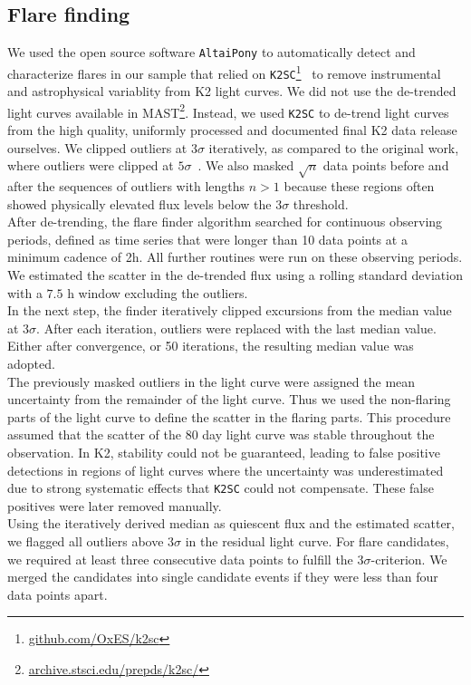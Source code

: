 \documentclass{aa}
\begin{document}
\subsection{Flare finding}
\label{sec:sec:flarefinding}
We used the open source software \texttt{AltaiPony} to automatically detect and characterize flares in our sample that relied on \texttt{K2SC}\footnote{\url{github.com/OxES/k2sc}}~\citep{aigrain_k2sc_2016} to remove instrumental and astrophysical variablity from K2 light curves. We did not use the de-trended light curves available in MAST\footnote{\url{archive.stsci.edu/prepds/k2sc/}}. Instead, we used \texttt{K2SC} to de-trend light curves from the high quality, uniformly processed and documented final K2 data release ourselves. We clipped outliers at $3\sigma$ iteratively, as compared to the original work, where outliers were clipped at $5\sigma$~\citep{aigrain_k2sc_2016}. We also masked $\sqrt{n}$ data points before and after the sequences of outliers with lengths $n>1$ because these regions often showed physically elevated flux levels below the $3\sigma$ threshold.
\\
After de-trending, the flare finder algorithm searched for continuous observing periods, defined as time series that were longer than 10 data points at a minimum cadence of 2\;h. All further routines were run on these observing periods. We estimated the scatter in the de-trended flux using a rolling standard deviation with a $7.5$ h window excluding the outliers. 
\\
In the next step, the finder iteratively clipped excursions from the median value at $3\sigma$. After each iteration, outliers were replaced with the last median value. Either after convergence, or 50 iterations, the resulting median value was adopted. 
\\
The previously masked outliers in the light curve were assigned the mean uncertainty from the remainder of the light curve. Thus we used the non-flaring parts of the light curve to define the scatter in the flaring parts. This procedure assumed that the scatter of the 80 day light curve was stable throughout the observation. In K2, stability could not be guaranteed, leading to false positive detections in regions of light curves where the uncertainty was underestimated due to strong systematic effects that \texttt{K2SC} could not compensate. These false positives were later removed manually. 
\\
Using the iteratively derived median as quiescent flux and the estimated scatter, we flagged all outliers above $3\sigma$ in the residual light curve. For flare candidates, we required at least three consecutive data points to fulfill the $3\sigma$-criterion. We merged the candidates into single candidate events if they were less than four data points apart. 
\end{document}
